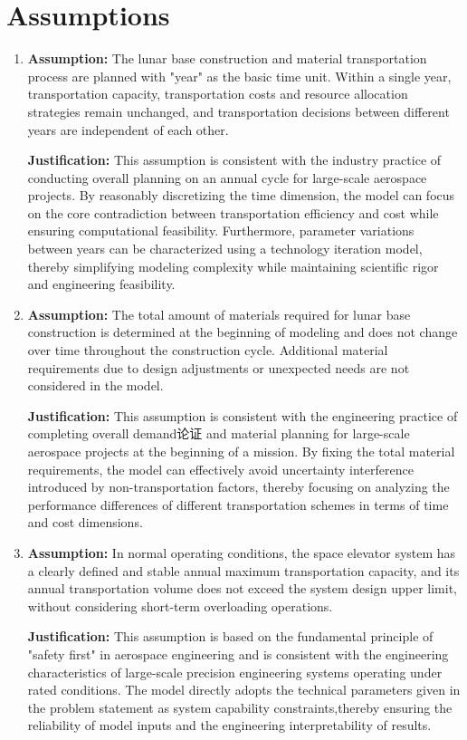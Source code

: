 \section{Assumptions} %

\begin{enumerate}
\item
\textbf{Assumption:}  
The lunar base construction and material transportation process are planned with "year" as the basic time unit. 
Within a single year, transportation capacity, transportation costs and resource allocation strategies remain unchanged, and transportation decisions between different years are independent of each other.

\textbf{Justification:}  
This assumption is consistent with the industry practice of conducting overall planning on an annual cycle for large-scale aerospace projects.
By reasonably discretizing the time dimension, the model can focus on the core contradiction between transportation efficiency and cost while ensuring computational feasibility.
Furthermore, parameter variations between years can be characterized using a technology iteration model, thereby simplifying modeling complexity while maintaining scientific rigor and engineering feasibility.
\item
\textbf{Assumption:}  
The total amount of materials required for lunar base construction is determined at the beginning of modeling and does not change over time throughout the construction cycle. 
Additional material requirements due to design adjustments or unexpected needs are not considered in the model.

\textbf{Justification:}  
This assumption is consistent with the engineering practice of completing overall demand论证 and material planning for large-scale aerospace projects at the beginning of a mission.
By fixing the total material requirements, the model can effectively avoid uncertainty interference introduced by non-transportation factors, thereby focusing on analyzing the performance differences of different transportation schemes in terms of time and cost dimensions.

\item
\textbf{Assumption:}  
In normal operating conditions, the space elevator system has a clearly defined and stable annual maximum transportation capacity,
and its annual transportation volume does not exceed the system design upper limit, without considering short-term overloading operations.

\textbf{Justification:}  
This assumption is based on the fundamental principle of "safety first" in aerospace engineering and is consistent with the engineering characteristics of large-scale precision engineering systems operating under rated conditions.
The model directly adopts the technical parameters given in the problem statement as system capability constraints,thereby ensuring the reliability of model inputs and the engineering interpretability of results.


\end{enumerate}
